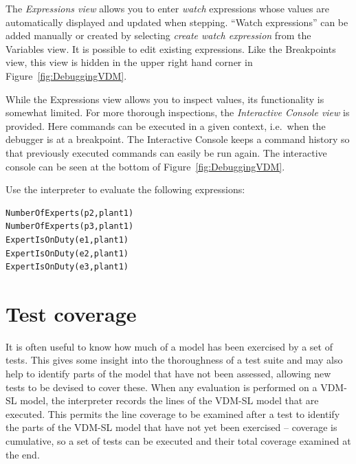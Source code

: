 {The \emph{Expressions view} allows you to enter \emph{watch}
expressions whose values are automatically displayed and updated when
stepping. ``Watch expressions'' can be added manually or created by
selecting \emph{create watch expression} from the Variables view. It
is possible to edit existing expressions.  Like the Breakpoints view,
this view is hidden in the upper right hand corner in
Figure~\ref{fig:DebuggingVDM}.

While the Expressions view allows you to inspect values, its
functionality is somewhat limited. For more thorough inspections, the
\emph{Interactive Console view} is provided. Here commands can be
executed in a given context, i.e.\ when the debugger is at a
breakpoint. The Interactive Console keeps a command history so that
previously executed commands can easily be run again. The interactive
console can be seen at the bottom of
Figure~\ref{fig:DebuggingVDM}.

\begin{myexercise}
\label{ex:tool-monitor}Use the interpreter to evaluate the
  following expressions:
\begin{lstlisting}
NumberOfExperts(p2,plant1)
NumberOfExperts(p3,plant1)
ExpertIsOnDuty(e1,plant1)
ExpertIsOnDuty(e2,plant1)
ExpertIsOnDuty(e3,plant1)
\end{lstlisting}
\end{myexercise}


\section{Test coverage}\label{sec:testcov}

It is often useful to know how much of a model has been exercised by a
set of tests. This gives some insight into the thoroughness of a test
suite and may also help to identify parts of the model that have not
been assessed, allowing new tests to be devised to cover these. When
any evaluation is performed on a VDM-SL model, the interpreter records
the lines of the VDM-SL model that are executed. This permits the line
coverage to be examined after a test to identify the parts of the
VDM-SL model that have not yet been exercised -- coverage is
cumulative, so a set of tests can be executed and their total coverage
examined at the end.

}
